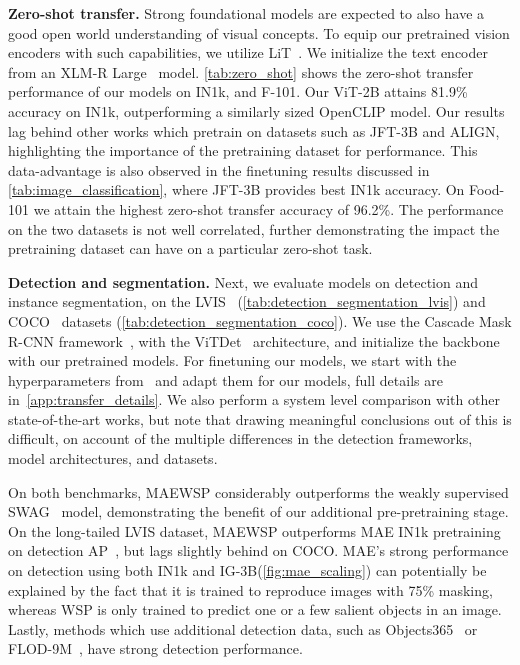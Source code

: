 \documentclass[10pt,twocolumn,letterpaper]{article}
\newcommand{\prept}{pre-pretraining\xspace}
\newcommand{\lit}{LiT\xspace}
\newcommand{\mae}{MAE\xspace}
\newcommand{\swag}{SWAG\xspace}
\newcommand{\ce}{WSP\xspace}
\newcommand{\ours}{MAEWSP\xspace}  \newcommand{\oursig}{\ours{}\textsubscript{IG}\xspace}
\newcommand{\openclip}{OpenCLIP\xspace}
\newcommand{\xlmr}{XLM-R\xspace}
\newcommand{\vitDet}{ViTDet\xspace}
\newcommand{\vitTwoB}{ViT-2B\xspace}
\newcommand{\igSizeShort}{IG-3B\xspace}
\newcommand{\inetOneKShort}{IN1k\xspace}
\newcommand{\cocoShort}{COCO\xspace}
\newcommand{\lvisShort}{LVIS\xspace}
\newcommand{\jftThreeB}{JFT-3B\xspace}
\newcommand{\food}{Food-101\xspace}
\newcommand{\foodShort}{F-101\xspace}
\newcommand{\objectsThreeSixFive}{Objects365\xspace}
\newcommand{\sota}{state-of-the-art\xspace}
\begin{document}
{\bf \noindent Zero-shot transfer.}
Strong foundational models are expected to also have a good open world understanding of visual concepts.
To equip our pretrained vision encoders with such capabilities, we utilize \lit~\cite{zhai2022lit}. 
We initialize the text encoder from an \xlmr Large~\cite{conneau2020unsupervised} model.
\cref{tab:zero_shot} shows the zero-shot
transfer performance of our models on \inetOneKShort, and \foodShort. Our \vitTwoB attains 81.9\% accuracy on 
\inetOneKShort, outperforming a similarly sized \openclip model. Our results lag behind other works which pretrain 
on datasets such as \jftThreeB and ALIGN, highlighting the importance of the pretraining dataset for performance. 
This data-advantage is also observed in the finetuning results discussed in \cref{tab:image_classification}, where 
\jftThreeB provides best \inetOneKShort accuracy. On \food we attain the highest zero-shot transfer accuracy of 96.2\%. 
The performance on the two datasets is not well correlated, further demonstrating the impact the pretraining 
dataset can have on a particular zero-shot task. 

{\bf \noindent Detection and segmentation.}
Next, we evaluate models on detection and instance segmentation, on the \lvisShort~\cite{gupta2019lvis} (\cref{tab:detection_segmentation_lvis}) 
and \cocoShort~\cite{lin2014microsoft} datasets (\cref{tab:detection_segmentation_coco}).
We use the Cascade Mask R-CNN framework~\cite{he2017maskrcnn}, with the \vitDet~\cite{li2022vitdet} architecture, and 
initialize the backbone with our pretrained models.
For finetuning our models, we start with the hyperparameters from~\cite{li2022vitdet} and adapt them for our models, 
full details are in~\cref{app:transfer_details}.
We also perform a system level comparison with other \sota works, but note that drawing meaningful conclusions out of this 
is difficult, on account
of the multiple differences in the detection frameworks, model architectures, and datasets.  

On both benchmarks, \ours considerably outperforms the weakly supervised \swag~\cite{singh2022revisiting} model, demonstrating the benefit of our 
additional \prept stage. On the long-tailed \lvisShort dataset, \ours outperforms \mae \inetOneKShort pretraining on detection 
AP~\cite{li2022vitdet}, 
but lags slightly behind on \cocoShort. \mae's strong performance on detection using both \inetOneKShort 
and \igSizeShort (\cref{fig:mae_scaling}) can potentially be explained by the fact that it is trained to reproduce images with 75\% 
masking, whereas \ce is only trained to predict one or a few salient objects in an image.
Lastly, methods which use additional detection data, such as \objectsThreeSixFive~\cite{shao2019objects365} or 
FLOD-9M~\cite{yuan2021florence}, have strong detection performance. 
\end{document}

